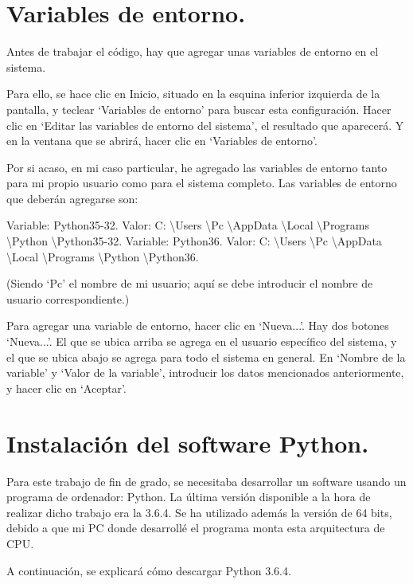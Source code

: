 \documentclass[12pt]{article}
\begin{document}
\section{Variables de entorno.}

Antes de trabajar el código, hay que agregar unas variables de entorno en el sistema.

Para ello, se hace clic en Inicio, situado en la esquina inferior izquierda de la pantalla, y teclear ‘Variables de entorno’ para buscar esta configuración. Hacer clic en ‘Editar las variables de entorno del sistema’, el resultado que aparecerá. Y en la ventana que se abrirá, hacer clic en ‘Variables de entorno’.

Por si acaso, en mi caso particular, he agregado las variables de entorno tanto para mi propio usuario como para el sistema completo. Las variables de entorno que deberán agregarse son:

Variable: Python35-32. Valor: C: \textbackslash Users \textbackslash Pc \textbackslash AppData \textbackslash Local \textbackslash Programs \textbackslash Python \textbackslash Python35-32.
Variable: Python36. Valor: C: \textbackslash Users \textbackslash Pc \textbackslash AppData \textbackslash Local \textbackslash Programs \textbackslash Python \textbackslash Python36.

(Siendo ‘Pc’ el nombre de mi usuario; aquí se debe introducir el nombre de usuario correspondiente.)

Para agregar una variable de entorno, hacer clic en ‘Nueva...’. Hay dos botones ‘Nueva...’. El que se ubica arriba se agrega en el usuario específico del sistema, y el que se ubica abajo se agrega para todo el sistema en general. En ‘Nombre de la variable’ y ‘Valor de la variable’, introducir los datos mencionados anteriormente, y hacer clic en ‘Aceptar’.




\section{Instalación del software Python.}

Para este trabajo de fin de grado, se necesitaba desarrollar un software usando un programa de ordenador: Python. La última versión disponible a la hora de realizar dicho trabajo era la 3.6.4. Se ha utilizado además la versión de 64 bits, debido a que mi PC donde desarrollé el programa monta esta arquitectura de CPU.

A continuación, se explicará cómo descargar Python 3.6.4.
\end{document}
